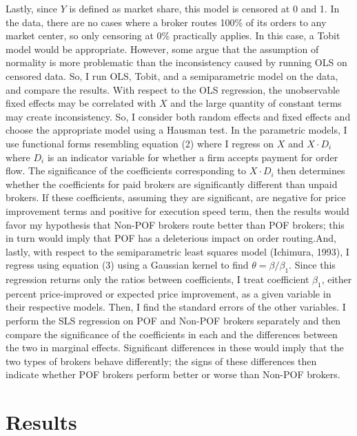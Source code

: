 \documentclass[12pt,a4paper]{article}
\begin{document}
	Lastly, since $Y$ is defined as market share, this model is censored at 0 and 1. In the data, there are no cases where a broker routes 100\% of its orders to any market center, so only censoring at 0\% practically applies. In this case, a Tobit model would be appropriate. However, some argue that the assumption of normality is more problematic than the inconsistency caused by running OLS on censored data. So, I run OLS, Tobit, and a semiparametric model on the data, and compare the results. With respect to the OLS regression, the unobservable fixed effects may be correlated with $X$ and the large quantity of constant terms may create inconsistency. So, I consider both random effects and fixed effects and choose the appropriate model using a Hausman test. In the parametric models, I use functional forms resembling equation (2) where I regress on $X$ and $X \cdot D_i$ where $D_i$ is an indicator variable for whether a firm accepts payment for order flow. The significance of the coefficients corresponding to $X \cdot D_i$ then determines whether the coefficients for paid brokers are significantly different than unpaid brokers. If these coefficients, assuming they are significant, are negative for price improvement terms and positive for execution speed term, then the results would favor my hypothesis that Non-POF brokers route better than POF brokers; this in turn would imply that POF has a deleterious impact on order routing.And, lastly, with respect to the semiparametric least squares model (Ichimura, 1993), I regress using equation (3) using a Gaussian kernel to find $\theta = \beta / \beta_1$. Since this regression returns only the ratios between coefficients, I treat coefficient $\beta_1$, either percent price-improved or expected price improvement, as a given variable in their respective models. Then, I find the standard errors of the other variables. I perform the SLS regression on POF and Non-POF brokers separately and then compare the significance of the coefficients in each and the differences between the two in marginal effects. Significant differences in these would imply that the two types of brokers behave differently; the signs of these differences then indicate whether POF brokers perform better or worse than Non-POF brokers. 
	
	


	
\section{Results}
\end{document}
